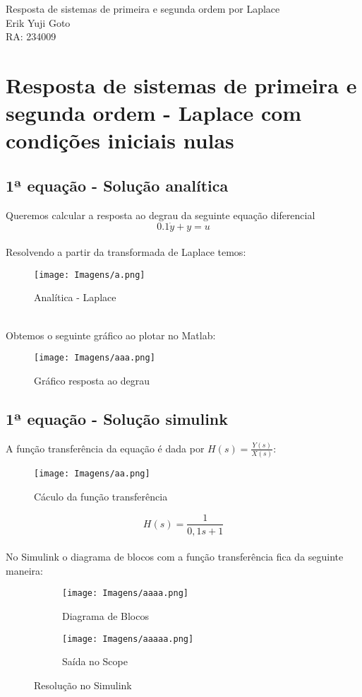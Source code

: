 \documentclass[a4paper, 12pt]{article}
\begin{document}
	\begin{center} %
		{\Large Resposta de sistemas de primeira e segunda ordem por Laplace}\\[0.4cm]
		{\large Erik Yuji Goto}\\[0.2cm]
		{\normalsize RA: 234009}
	\end{center} %

\section{Resposta de sistemas de primeira e segunda ordem - Laplace com condições iniciais nulas}
\subsection{1ª equação - Solução analítica}
Queremos calcular a resposta ao degrau da seguinte equação diferencial
	\begin{equation}
		0.1\dot{y} + y = u
	\end{equation}
	\\Resolvendo a partir da transformada de Laplace temos:
	\begin{figure}[h]
		\center
		\texttt{[image: Imagens/a.png]}
		\caption{Analítica - Laplace}
	\end{figure}
\\Obtemos o seguinte gráfico ao plotar no Matlab:
	\begin{figure}[h]
		\center
		\texttt{[image: Imagens/aaa.png]}
		\caption{Gráfico resposta ao degrau}
	\end{figure}
	
	
	\newpage
\subsection{1ª equação - Solução simulink}
	A função transferência da equação é dada por $H(s) = \frac{Y(s)}{X(s)}$:
	\begin{figure}[h]
		\center
		\texttt{[image: Imagens/aa.png]}
		\caption{Cáculo da função transferência}
	\end{figure}
	
	\begin{equation}
		H(s) = \frac{1}{0,1s + 1}
	\end{equation}
	\\No Simulink o diagrama de blocos com a função transferência fica da seguinte maneira:
	
	\begin{figure}[h]
	\centering
		\begin{subfigure}{.5\textwidth}
  			\centering
 			\texttt{[image: Imagens/aaaa.png]}
  			\caption{Diagrama de Blocos}
		\end{subfigure}%
		\begin{subfigure}{.5\textwidth}
  			\centering
  			\texttt{[image: Imagens/aaaaa.png]}
  			\caption{Saída no Scope}
		\end{subfigure}
			\caption{Resolução no Simulink}
	\end{figure}
\newpage
\end{document}
